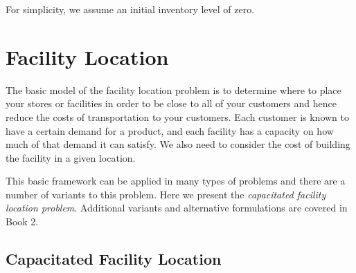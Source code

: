 For simplicity, we assume an initial inventory level of zero.

\section{Facility Location}
\label{sec:facility-location}
The basic model of the facility location problem is to determine where to place your stores or facilities in order to be close to all of your customers and hence reduce the costs of transportation to your customers.  Each customer is known to have a certain demand for a product, and each facility has a capacity on how much of that demand it can satisfy.  We also need to consider the cost of building the facility in a given location.

This basic framework can be applied in many types of problems and there are a number of variants to this problem. Here we present the \emph{capacitated facility location problem}. Additional variants and alternative formulations are covered in Book 2.



\subsection{Capacitated Facility Location}

